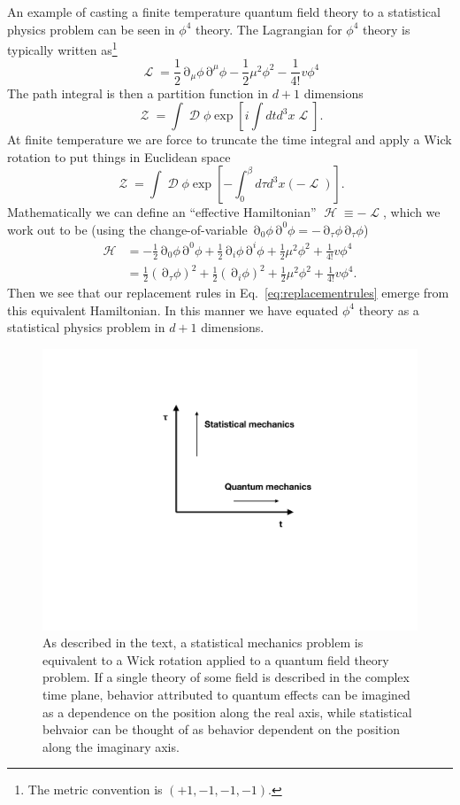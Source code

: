 \documentclass[%
 reprint,
nofootinbib,
 amsmath,amssymb,
 aps,
floatfix,
]{revtex4-1}
\DeclareMathOperator{\Lagr}{\mathcal{L}}
\DeclareMathOperator{\del}{\partial}
\DeclareMathOperator{\D}{\mathcal{D}}
\DeclareMathOperator{\Ham}{\mathcal{H}}
\DeclareMathOperator{\BigZ}{\mathcal{Z}}
\begin{document}
An example of casting a finite temperature quantum field theory to a statistical physics problem can be seen in $\phi^4$ theory.
The Lagrangian for $\phi^4$ theory is typically written as\footnote{The metric convention is $(+1, -1, -1, -1)$.}
\begin{equation}
    \Lagr = \frac{1}{2}\del_\mu \phi \del^\mu \phi - \frac{1}{2}\mu^2\phi^2 - \frac{1}{4!}v\phi^4\label{eq:phi4lagr}
\end{equation}
The path integral is then a partition function in $d+1$ dimensions
\begin{equation}
    \BigZ = \int \D\phi \exp\left[i\int dt d^3x \Lagr\right].
\end{equation}
At finite temperature we are force to truncate the time integral and apply a Wick rotation to put things in Euclidean space
\begin{equation}
   \BigZ = \int \D\phi \exp\left[-\int_0^\beta d\tau d^3x (-\Lagr)\right].
\end{equation}
Mathematically we can define an ``effective Hamiltonian'' $\Ham\equiv-\Lagr$, which we work out to be (using the change-of-variable $\del_0\phi\del^0\phi = -\del_\tau\phi\del_\tau\phi$)
\begin{equation}
\begin{split}
    \Ham &= -\frac{1}{2}\del_0\phi\del^0\phi + \frac{1}{2}\del_i\phi\del^i\phi + \frac{1}{2}\mu^2 \phi^2 + \frac{1}{4!}v \phi^4 \\
    &= \frac{1}{2}(\del_\tau\phi)^2 + \frac{1}{2} (\del_i\phi)^2 + \frac{1}{2}\mu^2 \phi^2 + \frac{1}{4!}v \phi^4.
\end{split}
\end{equation}
Then we see that our replacement rules in Eq.~\ref{eq:replacementrules} emerge from this equivalent Hamiltonian.
In this manner we have equated $\phi^4$ theory as a statistical physics problem in $d+1$ dimensions.
\begin{figure}
    \centering
    \includegraphics[width=0.8\linewidth]{smech_vs_qmech.pdf}
    \caption{As described in the text, a statistical mechanics problem is equivalent to a Wick rotation applied to a quantum field theory problem. If a single theory of some field is described in the complex time plane, behavior attributed to quantum effects can be imagined as a dependence on the position along the real axis, while statistical behvaior can be thought of as behavior dependent on the position along the imaginary axis.}
    \label{fig:complextime}
\end{figure}
\end{document}
